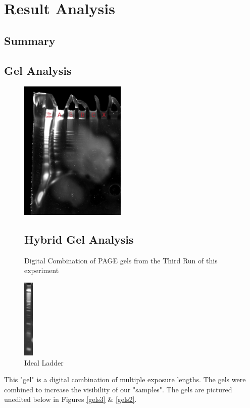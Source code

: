 \documentclass[letterpaper]{article}
\begin{document}
\section{Result Analysis}
\subsection{Summary}

\subsection{Gel Analysis}

\begin{figure}[ht]
\label{Hybrid Gel}
\begin{center}
\includegraphics[width=0.45\textwidth]{./gels/composite-gel-cropped.png}
\caption{Digital Combination of PAGE gels from the Third Run of this experiment}
\end{center}
\subsection{Hybrid Gel Analysis}
\end{figure}
\begin{figure}
\centering
\includegraphics[height=1.5in]{ladder-ideal.png}
\caption{Ideal Ladder}
\label{Ideal Ladder}
\end{figure}
This "gel" is a digital combination of multiple exposure lengths. The gels were combined to increase the visibility of our "samples". The gels are pictured unedited below in Figures \ref{gels3} \& \ref{gels2}.
\end{document}
